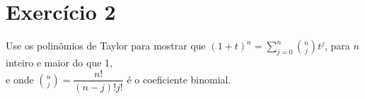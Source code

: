 \section{Exercício 2}

Use os polinômios de Taylor para mostrar que $(1 + t)^n = \sum_{j=0}^{n} \binom{n}{j} t^j$, para $n$ inteiro e maior do que 1, \\
e onde $\binom{n}{j} = \dfrac{n!}{(n - j)! j!}$ é o coeficiente binomial.





